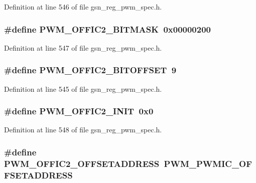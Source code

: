 Definition at line 546 of file gsn\_\-reg\_\-pwm\_\-spec.h.

\hypertarget{a00565_abe54248326e414e6b9152ae2b196f4e4}{
\subsubsection[{PWM\_\-OFFIC2\_\-BITMASK}]{\setlength{\rightskip}{0pt plus 5cm}\#define PWM\_\-OFFIC2\_\-BITMASK~0x00000200}}
\label{a00565_abe54248326e414e6b9152ae2b196f4e4}


Definition at line 547 of file gsn\_\-reg\_\-pwm\_\-spec.h.

\hypertarget{a00565_a257b9ca27dfc054f60faf59d9edac1a7}{
\subsubsection[{PWM\_\-OFFIC2\_\-BITOFFSET}]{\setlength{\rightskip}{0pt plus 5cm}\#define PWM\_\-OFFIC2\_\-BITOFFSET~9}}
\label{a00565_a257b9ca27dfc054f60faf59d9edac1a7}


Definition at line 545 of file gsn\_\-reg\_\-pwm\_\-spec.h.

\hypertarget{a00565_a93b0dc851986b12ea90b737fd896147a}{
\subsubsection[{PWM\_\-OFFIC2\_\-INIT}]{\setlength{\rightskip}{0pt plus 5cm}\#define PWM\_\-OFFIC2\_\-INIT~0x0}}
\label{a00565_a93b0dc851986b12ea90b737fd896147a}


Definition at line 548 of file gsn\_\-reg\_\-pwm\_\-spec.h.

\hypertarget{a00565_a4442dd1a7a9bb9bbb94778f3dd6463bd}{
\subsubsection[{PWM\_\-OFFIC2\_\-OFFSETADDRESS}]{\setlength{\rightskip}{0pt plus 5cm}\#define PWM\_\-OFFIC2\_\-OFFSETADDRESS~PWM\_\-PWMIC\_\-OFFSETADDRESS}}
\label{a00565_a4442dd1a7a9bb9bbb94778f3dd6463bd}


